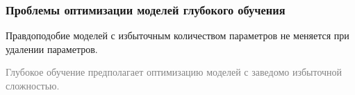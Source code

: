 \documentclass[usenames,dvipsnames,11pt,pdf,utf8,russian,aspectratio=169]{beamer}
\begin{document}
\begin{frame}    
                                                                                                                        
\frametitle{Проблемы оптимизации моделей глубокого обучения}                                                                                                          
Правдоподобие моделей с избыточным количеством параметров не меняется при удалении параметров.                                                       
\begin{figure}[h]                                                                                                                               
\centering                                                                                                                                      
\end{figure}                                                                                                   
\textcolor{gray}{Глубокое обучение предполагает оптимизацию моделей с заведомо избыточной сложностью.}  
                                                                                                                                             
\end{frame}    
\end{document}
